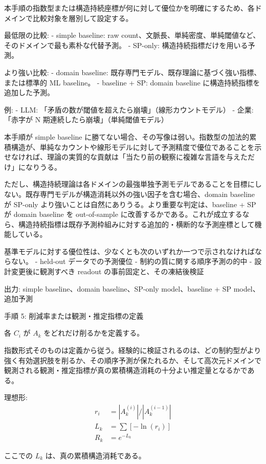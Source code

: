 \documentclass[12pt,a4paper]{article}
\begin{document}
本手順の指数型または構造持続座標が何に対して優位かを明確にするため、各ドメインで比較対象を層別して設定する。

最低限の比較: - simple baseline: raw count、文脈長、単純密度、単純閾値など、そのドメインで最も素朴な代替予測。 - SP-only: 構造持続指標だけを用いる予測。

より強い比較: - domain baseline: 既存専門モデル、既存理論に基づく強い指標、または標準的 ML baseline。 - baseline + SP: domain baseline に構造持続指標を追加した予測。

例: - LLM: 「矛盾の数が閾値を超えたら崩壊」（線形カウントモデル） - 企業: 「赤字が N 期連続したら崩壊」（単純閾値モデル）

本手順が simple baseline に勝てない場合、その写像は弱い。指数型の加法的累積構造が、単純なカウントや線形モデルに対して予測精度で優位であることを示せなければ、理論の実質的な貢献は「当たり前の観察に複雑な言語を与えただけ」になりうる。

ただし、構造持続理論は各ドメインの最強単独予測モデルであることを目標にしない。既存専門モデルが構造消耗以外の強い因子を含む場合、domain baseline が SP-only より強いことは自然にありうる。より重要な判定は、baseline + SP が domain baseline を out-of-sample に改善するかである。これが成立するなら、構造持続指標は既存予測枠組みに対する追加的・横断的な予測座標として機能している。

基準モデルに対する優位性は、少なくとも次のいずれか一つで示されなければならない。 - held-out データでの予測優位 - 制約の質に関する順序予測の的中 - 設計変更後に観測すべき readout の事前固定と、その凍結後検証

出力: simple baseline、domain baseline、SP-only model、baseline + SP model、追加予測

手順 5: 削減率または観測・推定指標の定義

各 \(C_{i}\) が \(A_{k}\) をどれだけ削るかを定義する。

指数形式そのものは定義から従う。経験的に検証されるのは、どの制約型がより強く有効選択肢を削るか、その順序予測が保たれるか、そして高次元ドメインで観測される観測・推定指標が真の累積構造消耗の十分よい推定量となるかである。

理想形: \[
\begin{aligned}
r_{i} &= |A_{k}^{(i)}| / |A_{k}^{(i-1)}| \\
L_{k} &= \sum[-\ln(r_{i})] \\
R_{k} &= e^{-L_{k}}
\end{aligned}
\]

ここでの \(L_{k}\) は、真の累積構造消耗である。
\end{document}
